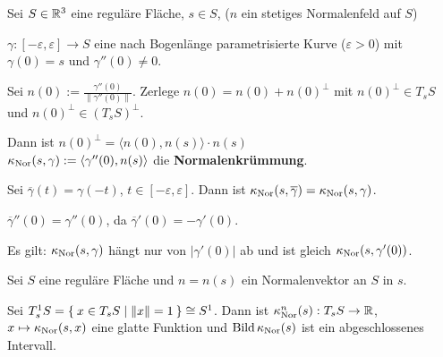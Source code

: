 \begin{definition}\label{def:18.4}%
    Sei $S \in \mathbb{R}^3$ eine reguläre Fläche, $s \in S$, ($n$ ein
    stetiges Normalenfeld auf $S$)

    $\gamma:[-\varepsilon, \varepsilon] \rightarrow S$ eine nach
    Bogenlänge parametrisierte Kurve ($\varepsilon > 0$) mit
    $\gamma(0) = s$ und $\gamma''(0) \neq 0$.

    Sei $n(0) := \frac{\gamma''(0)}{\|\gamma''(0)\|}$. Zerlege
    $n(0) = n(0) + n(0)^\bot$ mit $n(0)^\bot \in T_s S$ und
    $n(0)^\bot \in (T_s S)^\bot$.

    Dann ist $n(0)^\bot = \langle n(0), n(s) \rangle \cdot n(s)$\\
    $\kappa_{\textnormal{Nor}}(s, \gamma) := \langle \gamma''(0), n(s) \rangle$
    die \textbf{Normalenkrümmung}.
\end{definition}

\begin{bemerkung}
    Sei $\overline{\gamma}(t) = \gamma(-t)$, $t \in [- \varepsilon, \varepsilon]$.
    Dann ist $\kappa_{\textnormal{Nor}}(s, \overline{\gamma}) = \kappa_{\textnormal{Nor}}(s, \gamma)$.
\end{bemerkung}

\begin{beweis}
    $\overline{\gamma}''(0) = \gamma''(0)$, da $\overline{\gamma}'(0) = - \gamma'(0)$.

    Es gilt: $\kappa_{\textnormal{Nor}}(s,\gamma)$ hängt nur von $|\gamma'(0)|$ ab
    und ist gleich $\kappa_{\textnormal{Nor}}(s, \gamma'(0))$.
\end{beweis}

\begin{bemerkung}%
    Sei $S$ eine reguläre Fläche und $n=n(s)$ ein Normalenvektor an 
    $S$ in $s$.

    Sei $T_{s}^{1} S = \Set{x \in T_s S | \|x\| = 1} \cong S^1$.
    Dann ist $\kappa_{\textnormal{Nor}}^n(s): T_s S \rightarrow \mathbb{R}$,
    $x \mapsto \kappa_{\textnormal{Nor}}(s,x)$ eine glatte Funktion und 
    $\operatorname{Bild} \kappa_{\textnormal{Nor}}(s)$ ist ein abgeschlossenes Intervall.
\end{bemerkung}

